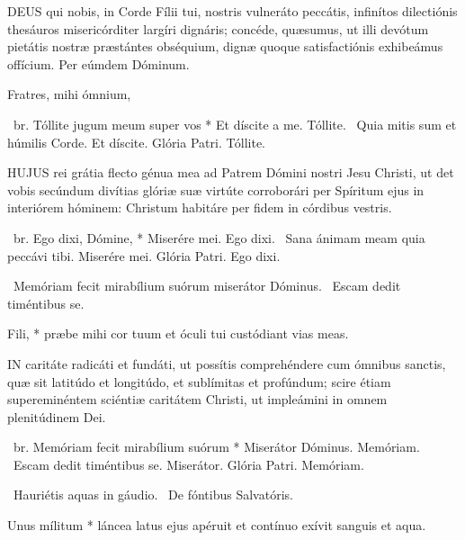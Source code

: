 
\lettrine[lines=2]{D}{EUS} qui nobis, in Corde Fílii tui, nostris vulneráto peccátis, infinítos dilectiónis thesáuros misericórditer largíri dignáris; concéde, quæsumus, ut illi devótum pietátis nostræ præstántes obséquium, dignæ quoque satisfactiónis exhibeámus offícium. Per eúmdem Dóminum.



 Fratres, mihi ómnium, 

\R\ br. Tóllite jugum meum super vos * Et díscite a me. Tóllite. \V\ Quia mitis sum et húmilis Corde. Et díscite. Glória Patri. Tóllite.



\lettrine[lines=2]{H}{UJUS} rei grátia flecto génua mea ad Patrem Dómini nostri Jesu Christi, ut det vobis secúndum divítias glóriæ suæ virtúte corroborári per Spíritum ejus in interiórem hóminem: Christum habitáre per fidem in córdibus vestris.

\R\ br. Ego dixi, Dómine, * Miserére mei. Ego dixi. \V\ Sana ánimam meam quia peccávi tibi. Miserére mei. Glória Patri. Ego dixi.

\V\ Memóriam fecit mirabílium suórum miserátor Dóminus. \R\ Escam dedit timéntibus se.


 Fili, * præbe mihi cor tuum et óculi tui custódiant vias meas.


\lettrine[lines=2]{I}{N} caritáte radicáti et fundáti, ut possítis comprehéndere cum ómnibus sanctis, quæ sit latitúdo et longitúdo, et sublímitas et profúndum; scire étiam supereminéntem sciéntiæ caritátem Christi, ut impleámini in omnem plenitúdinem Dei.

\R\ br. Memóriam fecit mirabílium suórum * Miserátor Dóminus. Memóriam. \V\ Escam dedit timéntibus se. Miserátor. Glória Patri. Memóriam.

\V\ Hauriétis aquas in gáudio. \R\ De fóntibus Salvatóris.


 Unus mílitum * láncea latus ejus apéruit et contínuo exívit sanguis et aqua.


